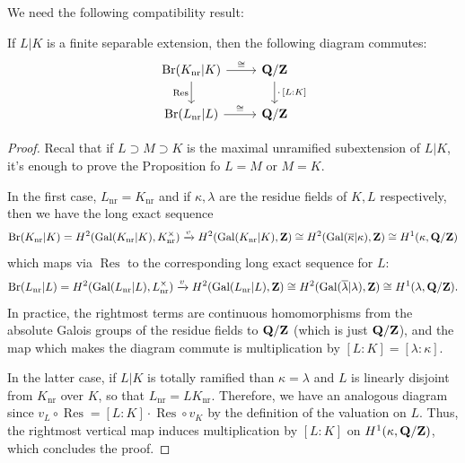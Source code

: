 \documentclass{article}
\begin{document}
We need the following compatibility result:
\begin{prop}
		If $L|K$ is a finite separable extension, then the following diagram commutes:
		\[
				\begin{tikzcd}
					\Br(K_\text{nr}|K) \arrow[r, "\cong"] \arrow[d, "\operatorname{Res}"'] & \Q/\Z \arrow[d, "\cdot\,\lbrack L:K\rbrack"] \\
					\Br(L_\text{nr}|L) \arrow[r, "\cong"] & \Q/\Z
				\end{tikzcd}
		\]
\end{prop}
\begin{proof}
		Recal that if $L\supset M\supset K$ is the maximal unramified subextension of $L|K$, it's enough to prove the Proposition fo $L=M$ or $M=K$.
		
		In the first case, $L_\text{nr}=K_\text{nr}$  and if $\kappa,\lambda$ are the residue fields of $K,L$ respectively, then we have the long exact sequence 
		\[
			\text{Br}(K_\text{nr}|K) = H^2(\operatorname{Gal}(K_\text{nr}|K),K_\text{nr}^\times) \xrightarrow{v} H^2(\operatorname{Gal}(K_\text{nr}|K),\mathbf{Z}) \cong H^2(\operatorname{Gal}(\overline{\kappa}|\kappa),\mathbf{Z}) \cong H^1(\kappa,\mathbf{Q}/\mathbf{Z}) \\
		\]
		which maps via $\operatorname{Res}$ to the corresponding long exact sequence for $L$:
		\[
			\text{Br}(L_\text{nr}|L) = H^2(\operatorname{Gal}(L_\text{nr}|L),L_\text{nr}^\times) \xrightarrow{v} H^2(\operatorname{Gal}(L_\text{nr}|L),\mathbf{Z}) \cong H^2(\operatorname{Gal}(\overline{\lambda}|\lambda),\mathbf{Z}) \cong H^1(\lambda,\mathbf{Q}/\mathbf{Z}).
		\]
		In practice, the rightmost terms are continuous homomorphisms from the absolute Galois groups of the residue fields to $\mathbf{Q}/\mathbf{Z}$ (which is just $\mathbf{Q}/\mathbf{Z}$), and the map which makes the diagram commute is multiplication by $[L:K]=[\lambda:\kappa]$.

		In the latter case, if $L|K$ is totally ramified than $\kappa=\lambda$ and $L$ is linearly disjoint from $K_\text{nr}$ over $K$, so that $L_\text{nr}=LK_\text{nr}$. Therefore, we have an analogous diagram
		since $v_L\circ \operatorname{Res} = [L:K]\cdot \operatorname{Res}\circ v_K$ by the definition of the valuation on $L$. Thus, the rightmost vertical map induces multiplication by $[L:K]$ on $H^1(\kappa,\mathbf{Q}/\mathbf{Z})$, which concludes the proof.
\end{proof}
\end{document}
